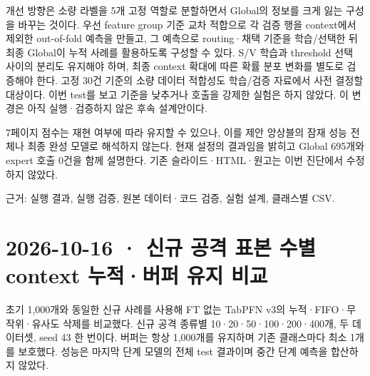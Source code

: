 개선 방향은 소량 라벨을 5개 고정 역할로 분할하면서 Global의 정보를 크게 잃는 구성을 바꾸는 것이다. 우선 feature group 기준 교차 적합으로 각 검증 행을 context에서 제외한 out-of-fold 예측을 만들고, 그 예측으로 routing·채택 기준을 학습/\allowbreak{}선택한 뒤 최종 Global이 누적 사례를 활용하도록 구성할 수 있다. S/\allowbreak{}V 학습과 threshold 선택 사이의 분리도 유지해야 하며, 최종 context 확대에 따른 확률 분포 변화를 별도로 검증해야 한다. 고정 30건 기준의 소량 데이터 적합성도 학습/\allowbreak{}검증 자료에서 사전 결정할 대상이다. 이번 test를 보고 기준을 낮추거나 호출을 강제한 실험은 하지 않았다. 이 변경은 아직 실행·검증하지 않은 후속 설계안이다.

7페이지 점수는 재현 여부에 따라 유지할 수 있으나, 이를 제안 앙상블의 잠재 성능 전체나 최종 완성 모델로 해석하지 않는다. 현재 설정의 결과임을 밝히고 Global 695개와 expert 호출 0건을 함께 설명한다. 기존 슬라이드·HTML·원고는 이번 진단에서 수정하지 않았다.

근거: 실행 결과, 실행 검증, 원본 데이터·코드 검증, 실험 설계, 클래스별 CSV.



\section{2026-10-16 · 신규 공격 표본 수별 context 누적·버퍼 유지 비교}
\label{report:20261016_exp83_results}
초기 1,000개와 동일한 신규 사례를 사용해 FT 없는 TabPFN v3의 누적·FIFO·무작위·유사도 삭제를 비교했다. 신규 공격 종류별 10·20·50·100·200·400개, 두 데이터셋, seed 43 한 번이다. 버퍼는 항상 1,000개를 유지하며 기존 클래스마다 최소 1개를 보호했다. 성능은 마지막 단계 모델의 전체 test 결과이며 중간 단계 예측을 합산하지 않았다.

